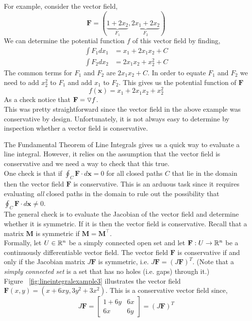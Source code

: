 \documentclass[12pt]{article}
\begin{document}
For example, consider the vector field,
\[
\mathbf{F}=(\underbrace{1+2x_2}_{F_1}, \underbrace{2x_1+2x_2}_{F_2})
\]
We can determine the potential function $f$ of this vector field by finding,
\begin{align*}
\int F_1 dx_1 &= x_1 + 2x_1x_2 + C \\
\int F_2 dx_2 &= 2x_1x_2 + x_2^2 + C
\end{align*}
The common terms for $F_1$ and $F_2$ are $2x_1x_2+C$. In order to equate $F_1$ and $F_2$ we need to add $x_2^2$ to $F_1$ and add $x_1$ to $F_2$. This gives us the potential function of $\mathbf{F}$
\[
f(\mathbf{x}) = x_1 + 2x_1x_2 + x_2^2
\]
As a check notice that $\mathbf{F}=\triangledown f$. \\

This was pretty straightforward since the vector field in the above example was conservative by design. Unfortunately, it is not always easy to determine by inspection whether a vector field is conservative. 

The Fundamental Theorem of Line Integrals gives us a quick way to evaluate a line integral. However, it relies on the assumption that the vector field is conservative and we need a way to check that this true. \\

One check is that if $\oint_C \mathbf{F} \cdot d\mathbf{x} = 0$ for all closed paths $C$ that lie in the domain then the vector field $\mathbf{F}$ is conservative. This is an arduous task since it requires evaluating \emph{all} closed paths in the domain to rule out the possibility that $\oint_C \mathbf{F} \cdot d\mathbf{x} \neq 0$. \\

The general check is to evaluate the Jacobian of the vector field and determine whether it is symmetric. If it is then the vector field is conservative. Recall that a matrix $\mathbf{M}$ is symmetric if $\mathbf{M}=\mathbf{M}^\top$. \\

Formally, let $U\in\mathbb{R}^n$ be a simply connected open set and let $\mathbf{F}:U\rightarrow\mathbb{R}^n$ be a continuously differentiable vector field. The vector field $\mathbf{F}$ is conservative if and only if the Jacobian matrix $J\mathbf{F}$ is symmetric, i.e. $J\mathbf{F}=(J\mathbf{F})^T$. (Note that a \emph{simply connected set} is a set that has no holes (i.e. gaps) through it.) \\

Figure ~\ref{fig:lineintegralexample3} illustrates the vector field $\mathbf{F}(x,y) = (x+6xy, 3y^2+3x^2)$. This is a conservative vector field since,
\[
J\mathbf{F} =
\begin{bmatrix}
1+6y & 6x \\
6x & 6y
\end{bmatrix}
=
(J\mathbf{F})^T
\]
\end{document}
